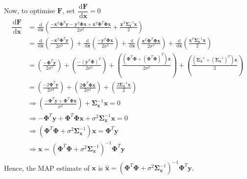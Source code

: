 \documentclass[a4paper]{article}
\begin{document}
Now, to optimise $\bm{F}$, set $\dfrac{\,\textrm{d}\bm{F}}{\,\textrm{d}\bm{x}} = 0$
\begin{align*}
\dfrac{\,\textrm{d}\bm{F}}{\,\textrm{d}\bm{x}}
&= \frac{\,\textrm{d}}{\,\textrm{d} \bm{x}}\left(\frac{-\bm{x}^T\bm{\Phi}^T\bm{y}-\bm{y}^T\bm{\Phi}\bm{x}+\bm{x}^T\bm{\Phi}^T\bm{\Phi}\bm{x}}{2\sigma^2} + \frac{\bm{x}^T\bm{\Sigma}_{\bm{x}}^{-1}\bm{x}}{2}\right)\\
&= \frac{\,\textrm{d}}{\,\textrm{d} \bm{x}}\left(\frac{-\bm{x}^T\bm{\Phi}^T\bm{y}}{2\sigma^2}\right) + \frac{\,\textrm{d}}{\,\textrm{d} \bm{x}}\left(\frac{-\bm{y}^T\bm{\Phi}\bm{x}}{2\sigma^2}\right) + \frac{\,\textrm{d}}{\,\textrm{d} \bm{x}}\left(\frac{\bm{x}^T\bm{\Phi}^T\bm{\Phi}\bm{x}}{2\sigma^2}\right) +  \frac{\,\textrm{d}}{\,\textrm{d} \bm{x}}\left(\frac{\bm{x}^T\bm{\Sigma}_{\bm{x}}^{-1}\bm{x}}{2}\right)\\
&= \left(\frac{-\bm{\Phi}^T\bm{y}}{2\sigma^2}\right) + \left(\frac{-(\bm{y}^T\bm{\Phi})^T}{2\sigma^2}\right) + \left(\frac{\left(\bm{\Phi}^T\bm{\Phi}+(\bm{\Phi}^T\bm{\Phi})^T\right)\bm{x}}{2\sigma^2}\right) +  \left(\frac{\left(\bm{\Sigma}_{\bm{x}}^{-1}+(\bm{\Sigma}_{\bm{x}}^{-1})^T\right)\bm{x}}{2}\right)\\
&=\left(\frac{-2\bm{\Phi}^T\bm{y}}{2\sigma^2}\right) + \left(\frac{2\bm{\Phi}^T\bm{\Phi}\bm{x}}{2\sigma^2}\right) +  \left(\frac{2\bm{\Sigma}_{\bm{x}}^{-1}\bm{x}}{2}\right)\\
&\Rightarrow \left(\frac{-\bm{\Phi}^T\bm{y}+\bm{\Phi}^T\bm{\Phi}\bm{x}}{\sigma^2}\right) + \bm{\Sigma}_{\bm{x}}^{-1}\bm{x}=0\\
&\Rightarrow -\bm{\Phi}^T\bm{y}+\bm{\Phi}^T\bm{\Phi}\bm{x} + \sigma^2\bm{\Sigma}_{\bm{x}}^{-1}\bm{x}=0\\
&\Rightarrow \left(\bm{\Phi}^T\bm{\Phi} + \sigma^2\bm{\Sigma}_{\bm{x}}^{-1}\right)\bm{x} = \bm{\Phi}^T\bm{y}\\
&\Rightarrow \bm{x} = \left(\bm{\Phi}^T\bm{\Phi} + \sigma^2\bm{\Sigma}_{\bm{x}}^{-1}\right)^{-1}\bm{\Phi}^T\bm{y}\\
\end{align*}
Hence, the MAP estimate of $\bm{x}$ is $\bm{\hat{x}} = \left(\bm{\Phi}^T\bm{\Phi} + \sigma^2\bm{\Sigma}_{\bm{x}}^{-1}\right)^{-1}\bm{\Phi}^T\bm{y}$.
\end{document}
